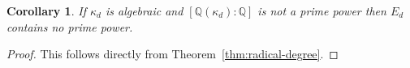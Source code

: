\documentclass{article}
\theoremstyle{plain}
\newtheorem{corollary}[theorem]{Corollary}
\theoremstyle{definition}
\theoremstyle{remark}
\newtheorem{remark}[theorem]{Remark}
\newcommand{\Q}{\mathbb{Q}}
\begin{document}
\begin{corollary}
    If $\kappa_d$ is algebraic and $[\Q(\kappa_d) \colon \Q]$ is not a prime power then $E_d$ contains no prime power.
\end{corollary}

\begin{proof}
    This follows directly from Theorem~\ref{thm:radical-degree}.
\end{proof}



\end{document}
